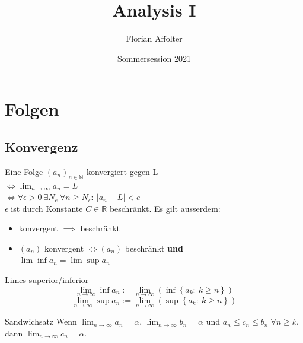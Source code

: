 \documentclass[a4paper,10pt]{article}
\title{Analysis I}
\author{Florian Affolter}
\date{Sommersession 2021}
\def\limn{\lim_{n\to \infty}}
\def\R{\mathbb{R}}
\begin{document}
\maketitle



\RaggedRight

\section{Folgen}
\subsection{Konvergenz}
Eine Folge $(a_n)_{n\in \mathbb{N}}$ konvergiert gegen L \\ $\iff \lim_{n \to \infty} a_n = L $ \\ $\iff \forall \epsilon > 0 \ \exists N_e \ \forall n \ge N_\epsilon : \ | a_n - L | < e$\\

$\epsilon$ ist durch Konstante $C \in \R$ beschränkt.
Es gilt ausserdem:
\begin{itemize}
 \item konvergent $\implies$ beschränkt
 \item $(a_n)$ konvergent $\iff (a_n)$ beschränkt \textbf{und} \\$\lim \inf a_n = \lim \sup a_n$
\end{itemize}


\begin{subbox}{Limes superior/inferior}
\[ \limn \inf a_n := \limn \left( \inf \left\{ a_k : \: k \geq n \right\} \right) \]
\[ \limn \sup a_n := \limn \left( \sup \left\{ a_k : \: k \geq n \right\} \right) \]
\end{subbox}

\begin{subbox}{Sandwichsatz}
Wenn $\limn a_n = \alpha$, $\limn b_n = \alpha$ und $a_n \le c_n \le b_n \; \forall n \ge k$, dann $\limn c_n = \alpha$.
\end{subbox}
\end{document}
